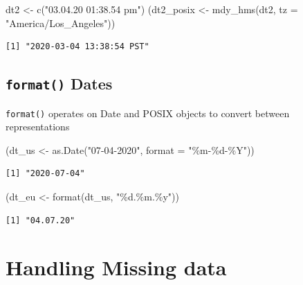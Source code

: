 \documentclass[
]{book}
\newenvironment{Shaded}{\begin{snugshade}}{\end{snugshade}}
\newcommand{\AttributeTok}[1]{\textcolor[rgb]{0.77,0.63,0.00}{#1}}
\newcommand{\FunctionTok}[1]{\textcolor[rgb]{0.00,0.00,0.00}{#1}}
\newcommand{\NormalTok}[1]{#1}
\newcommand{\OtherTok}[1]{\textcolor[rgb]{0.56,0.35,0.01}{#1}}
\newcommand{\StringTok}[1]{\textcolor[rgb]{0.31,0.60,0.02}{#1}}
\begin{document}
\begin{Shaded}
\begin{Highlighting}[]
\NormalTok{dt2 }\OtherTok{\textless{}{-}} \FunctionTok{c}\NormalTok{(}\StringTok{"03.04.20 01:38.54 pm"}\NormalTok{)}
\NormalTok{(dt2\_posix }\OtherTok{\textless{}{-}} \FunctionTok{mdy\_hms}\NormalTok{(dt2, }\AttributeTok{tz =} \StringTok{"America/Los\_Angeles"}\NormalTok{))}
\end{Highlighting}
\end{Shaded}

\begin{verbatim}
[1] "2020-03-04 13:38:54 PST"
\end{verbatim}

\hypertarget{format-dates}{%
\section{\texorpdfstring{\texttt{format()} Dates}{format() Dates}}\label{format-dates}}

\texttt{format()} operates on Date and POSIX objects to convert between representations

\begin{Shaded}
\begin{Highlighting}[]
\NormalTok{(dt\_us }\OtherTok{\textless{}{-}} \FunctionTok{as.Date}\NormalTok{(}\StringTok{"07{-}04{-}2020"}\NormalTok{, }\AttributeTok{format =} \StringTok{"\%m{-}\%d{-}\%Y"}\NormalTok{))}
\end{Highlighting}
\end{Shaded}

\begin{verbatim}
[1] "2020-07-04"
\end{verbatim}

\begin{Shaded}
\begin{Highlighting}[]
\NormalTok{(dt\_eu }\OtherTok{\textless{}{-}} \FunctionTok{format}\NormalTok{(dt\_us, }\StringTok{"\%d.\%m.\%y"}\NormalTok{))}
\end{Highlighting}
\end{Shaded}

\begin{verbatim}
[1] "04.07.20"
\end{verbatim}

\hypertarget{missingdata}{%
\chapter{Handling Missing data}\label{missingdata}}
\end{document}
